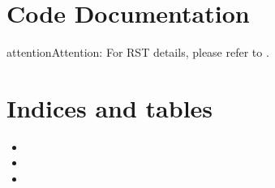 \documentclass[letterpaper,10pt,english]{sphinxmanual}
\begin{document}
\sphinxstepscope


\chapter{Code Documentation}
\label{\detokenize{docs/ShavitFranchezAlg/code:code-documentation}}\label{\detokenize{docs/ShavitFranchezAlg/code::doc}}

\begin{savenotes}\sphinxattablestart
\sphinxthistablewithglobalstyle
\sphinxthistablewithnovlinesstyle
\centering
\begin{tabulary}{\linewidth}[t]{}
\sphinxtoprule
\sphinxtableatstartofbodyhook\sphinxbottomrule
\end{tabulary}
\sphinxtableafterendhook\par
\sphinxattableend\end{savenotes}

\begin{sphinxadmonition}{attention}{Attention:}
\sphinxAtStartPar
For RST details, please refer to .
\end{sphinxadmonition}


\chapter{Indices and tables}
\label{\detokenize{index:indices-and-tables}}\begin{itemize}
\item {} 
\sphinxAtStartPar
{}

\item {} 
\sphinxAtStartPar
{}

\item {} 
\sphinxAtStartPar
{}

\end{itemize}
\end{document}
